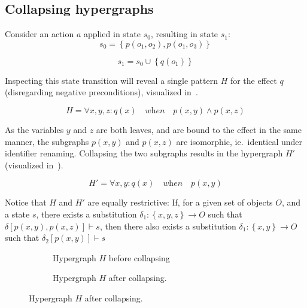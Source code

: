\documentclass[../Master.tex]{subfiles}
\providecommand{\master}{..}
\begin{document}
\subsection{Collapsing hypergraphs}



\begin{example}

	Consider an action $a$ applied in state $s_0$, resulting in state $s_1$:
	\begin{equation*}
		s_0 = \left\{ 
			p\left(o_1, o_2\right), p\left(o_1, o_3\right)
		\right\}
	\end{equation*}

	\begin{equation*}
		s_1 = s_0 \cup \left\{
			q\left( o_1 \right)
		\right\}
	\end{equation*}

	Inspecting this state transition will reveal a single pattern $H$ for the effect $q$ (disregarding negative preconditions), visualized in~.

    \begin{equation*}
        H = \forall x, y, z : q(x) \quad \textit{when} \quad
            p(x,y) \land p(x,z)
    \end{equation*}

	As the variables $y$ and $z$ are both leaves, and are bound to the effect in the same manner, the subgraphs $p(x,y)$ and $p(x,z)$ are isomorphic, ie.\ identical under identifier renaming. Collapsing the two subgraphs results in the hypergraph $H'$ (visualized in~).
	
    \begin{equation*}
        H' = \forall x, y : q(x) \quad \textit{when} \quad p(x,y)
    \end{equation*}

	Notice that $H$ and $H'$ are equally restrictive: If, for a given set of objects $O$, and a state $s$, there exists a substitution $\delta_1 : \left\{x, y, z\right\} \rightarrow O$ such that $\delta\left[p(x,y), p(x,z)\right] \vdash s$, then there also exists a substitution $\delta_1 : \left\{x, y\right\} \rightarrow O$ such that $\delta_2\left[p(x,y)\right] \vdash s$

	\begin{figure}\label{fig:ex:ca:hgma:ex:collapsing}
        \centering
        \hfill
        \begin{subfigure}[b]{0.4\textwidth}
            \centering
            \resizebox{0.7\linewidth}{!}{}
            \caption{Hypergraph $H$ before collapsing}
            \label{fig:ex:ca:hgma:ex:isomorphic}
        \end{subfigure}%
        \hfill%
        \begin{subfigure}[b]{0.4\textwidth}
            \centering
            \resizebox{0.75\linewidth}{!}{}
            \caption{Hypergraph $H$ after collapsing.}
            \label{fig:ex:ca:hgma:ex:isomorphicReduced}
        \end{subfigure}
        \hfill
    \end{figure}
\end{example}
\end{document}
